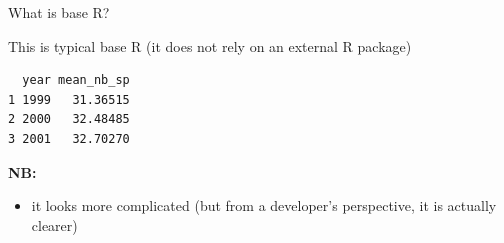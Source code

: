 \documentclass[
  ignorenonframetext,
  aspectratio=169,
]{beamer}
\newenvironment{Shaded}{\begin{snugshade}}{\end{snugshade}}
\newcommand{\AttributeTok}[1]{\textcolor[rgb]{0.40,0.45,0.13}{#1}}
\newcommand{\ConstantTok}[1]{\textcolor[rgb]{0.56,0.35,0.01}{#1}}
\newcommand{\ControlFlowTok}[1]{\textcolor[rgb]{0.00,0.23,0.31}{\textbf{#1}}}
\newcommand{\DecValTok}[1]{\textcolor[rgb]{0.68,0.00,0.00}{#1}}
\newcommand{\FunctionTok}[1]{\textcolor[rgb]{0.28,0.35,0.67}{#1}}
\newcommand{\NormalTok}[1]{\textcolor[rgb]{0.00,0.23,0.31}{#1}}
\newcommand{\OtherTok}[1]{\textcolor[rgb]{0.00,0.23,0.31}{#1}}
\newcommand{\SpecialCharTok}[1]{\textcolor[rgb]{0.37,0.37,0.37}{#1}}
\newcommand{\StringTok}[1]{\textcolor[rgb]{0.13,0.47,0.30}{#1}}
\providecommand{\tightlist}{%
  \setlength{\itemsep}{0pt}\setlength{\parskip}{0pt}}
\begin{document}
\begin{frame}[fragile]{What is base R?}
\protect{}\label{what-is-base-r-1}
\begin{block}{This is typical base R (it does not rely on an external R
package)}
\protect{}\label{this-is-typical-base-r-it-does-not-rely-on-an-external-r-package}
\footnotesize

\begin{Shaded}
\end{Shaded}

\begin{verbatim}
  year mean_nb_sp
1 1999   31.36515
2 2000   32.48485
3 2001   32.70270
\end{verbatim}

\normalsize

\vspace{1em}

\textbf{NB:}

\begin{itemize}
\tightlist
\item
  it looks more complicated (but from a developer's perspective, it is
  actually clearer)
\end{itemize}
\end{block}
\end{frame}
\end{document}
